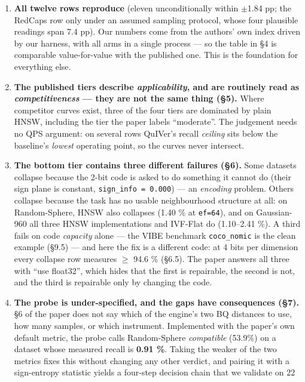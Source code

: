 \documentclass[
  10pt,
]{article}
\providecommand{\tightlist}{%
  \setlength{\itemsep}{0pt}\setlength{\parskip}{0pt}}
\begin{document}
\begin{enumerate}
\def\labelenumi{\arabic{enumi}.}
\tightlist
\item
  \textbf{All twelve rows reproduce} (eleven unconditionally within
  $\pm$1.84 pp; the RedCaps row only under an assumed sampling protocol,
  whose four plausible readings span 7.4 pp). Our numbers come from the
  authors' own index driven by our harness, with all arms in a single
  process --- so the table in §4 is comparable value-for-value with the
  published one. This is the foundation for everything else.
\item
  \textbf{The published tiers describe \emph{applicability}, and are
  routinely read as \emph{competitiveness} --- they are not the same
  thing (§5).} Where competitor curves exist, three of the four tiers
  are dominated by plain HNSW, including the tier the paper labels
  ``moderate''. The judgement needs no QPS argument: on several rows
  QuIVer's recall \emph{ceiling} sits below the baseline's \emph{lowest}
  operating point, so the curves never intersect.
\item
  \textbf{The bottom tier contains three different failures (§6).} Some
  datasets collapse because the 2-bit code is asked to do something it
  cannot do (their sign plane is constant,
  \texttt{sign\_info\ =\ 0.000}) --- an \emph{encoding} problem. Others
  collapse because the task has no usable neighbourhood structure at
  all: on Random-Sphere, HNSW also collapses (1.40 \% at
  \texttt{ef=64}), and on Gaussian-960 all three HNSW implementations
  and IVF-Flat do (1.10--2.41 \%). A third fails on code \emph{capacity}
  alone --- the VIBE benchmark \texttt{coco\_nomic} is the clean example
  (§9.5) --- and here the fix is a different code: at 4 bits per
  dimension every collapse row measures $\geq$ 94.6 \% (§6.5). The paper
  answers all three with ``use float32'', which hides that the first is
  repairable, the second is not, and the third is repairable only by
  changing the code.
\item
  \textbf{The probe is under-specified, and the gaps have consequences
  (§7).} §6 of the paper does not say which of the engine's two BQ
  distances to use, how many samples, or which instrument. Implemented
  with the paper's own default metric, the probe calls Random-Sphere
  \emph{compatible} (53.9\%) on a dataset whose measured recall is
  \textbf{0.91 \%}. Taking the weaker of the two metrics fixes this
  without changing any other verdict, and pairing it with a sign-entropy
  statistic yields a four-step decision chain that we validate on 22

\end{enumerate}
\end{document}
